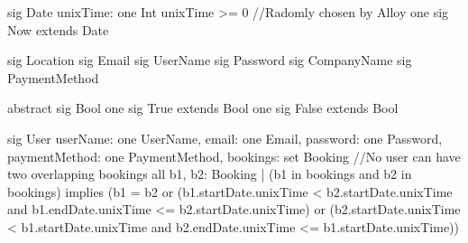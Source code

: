 \documentclass[11pt]{article}
\def\code#1{{\texttt{#1}}}
\begin{document}

\begin{ffcode}
    sig Date {
	unixTime: one Int
    } {
    	unixTime >= 0
    }
    //Radomly chosen by Alloy
    one sig Now extends Date {}
    
    sig Location {}
    sig Email {}
    sig UserName {}
    sig Password {}
    sig CompanyName {}
    sig PaymentMethod {}
    
    abstract sig Bool {}
    one sig True extends Bool {}
    one sig False extends Bool {}
    
    sig User {
    	userName: one UserName,
    	email: one Email,
    	password: one Password,
    	paymentMethod: one PaymentMethod,
    	bookings: set Booking
    } {
    	//No user can have two overlapping bookings
    	all b1, b2: Booking | (b1 in bookings and b2 in bookings)
    	implies
    	(b1 = b2 or (b1.startDate.unixTime < b2.startDate.unixTime and b1.endDate.unixTime <= b2.startDate.unixTime) or
    	(b2.startDate.unixTime < b1.startDate.unixTime and b2.endDate.unixTime <= b1.startDate.unixTime))
    }
\end{ffcode}
\end{document}
